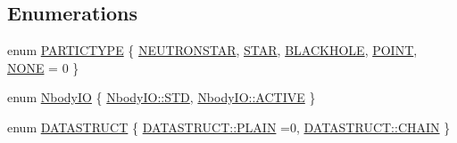 \subsection*{Enumerations}
\begin{DoxyCompactItemize}
\item 
enum \mbox{\hyperlink{namespace_space_h_a5d46b61fb1db52e69e41f33f443c3385}{P\+A\+R\+T\+I\+C\+T\+Y\+PE}} \{ \newline
\mbox{\hyperlink{namespace_space_h_a5d46b61fb1db52e69e41f33f443c3385a5fefeb288bcbd250bc9a221a268cca70}{N\+E\+U\+T\+R\+O\+N\+S\+T\+AR}}, 
\mbox{\hyperlink{namespace_space_h_a5d46b61fb1db52e69e41f33f443c3385a4734f1829ea94173cc7b287c89c0dcd2}{S\+T\+AR}}, 
\mbox{\hyperlink{namespace_space_h_a5d46b61fb1db52e69e41f33f443c3385a6488bc68110a0444862f21c6e3dca3ed}{B\+L\+A\+C\+K\+H\+O\+LE}}, 
\mbox{\hyperlink{namespace_space_h_a5d46b61fb1db52e69e41f33f443c3385ab7288e9167a9a146ca1662a47c0e8767}{P\+O\+I\+NT}}, 
\newline
\mbox{\hyperlink{namespace_space_h_a5d46b61fb1db52e69e41f33f443c3385a5f9a11cf0e89bd48050fa58999d9d768}{N\+O\+NE}} = 0
 \}
\item 
enum \mbox{\hyperlink{namespace_space_h_a296a8bae763a754564bfdce216e31b59}{Nbody\+IO}} \{ \mbox{\hyperlink{namespace_space_h_a296a8bae763a754564bfdce216e31b59ac6ce23be5d350ce18a665427d2d950f7}{Nbody\+I\+O\+::\+S\+TD}}, 
\mbox{\hyperlink{namespace_space_h_a296a8bae763a754564bfdce216e31b59a18ff74f43da410c5529f7d6fca84f115}{Nbody\+I\+O\+::\+A\+C\+T\+I\+VE}}
 \}
\item 
enum \mbox{\hyperlink{namespace_space_h_a4782f089179a3c269891f02482b072df}{D\+A\+T\+A\+S\+T\+R\+U\+CT}} \{ \mbox{\hyperlink{namespace_space_h_a4782f089179a3c269891f02482b072dfaf62eb0bf5e5c72e80983fbbac1cb70e5}{D\+A\+T\+A\+S\+T\+R\+U\+C\+T\+::\+P\+L\+A\+IN}} =0, 
\mbox{\hyperlink{namespace_space_h_a4782f089179a3c269891f02482b072dfa014d2cf3cdc3af6f4f92c09190860e33}{D\+A\+T\+A\+S\+T\+R\+U\+C\+T\+::\+C\+H\+A\+IN}}
 \}
\end{DoxyCompactItemize}
